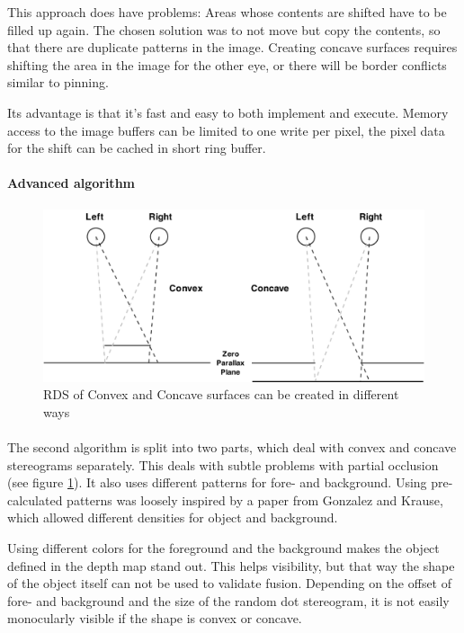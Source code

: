 This approach does have problems: Areas whose contents are shifted have to be filled up again.
The chosen solution was to not move but copy the contents, so that there are duplicate patterns in the image.
Creating concave surfaces requires shifting the area in the image for the other eye, or there will be border conflicts similar to pinning.

Its advantage is that it's fast and easy to both implement and execute.
Memory access to the image buffers can be limited to one write per pixel, the pixel data for the shift can be cached in short ring buffer.

\paragraph{Advanced algorithm}
\begin{figure}[htb]
\begin{center}
\includegraphics[width=15.5cm]{media/rds.pdf}
\caption{RDS of Convex and Concave surfaces can be created in different ways\label{ccRDS}}
\end{center}
\end{figure}

\paragraph{}
The second algorithm is split into two parts, which deal with convex and concave stereograms separately.
This deals with subtle problems with partial occlusion (see figure \ref{ccRDS}).
It also uses different patterns for fore- and background.
Using pre-calculated patterns was loosely inspired by a paper from Gonzalez and Krause\cite{GenRDS}, which allowed different densities for object and background.

Using different colors for the foreground and the background makes the object defined in the depth map stand out. This helps visibility, but that way the shape of the object itself can not be used to validate fusion. Depending on the offset of fore- and background and the size of the random dot stereogram, it is not easily monocularly visible if the shape is convex or concave.

